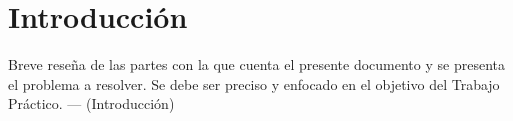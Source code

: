 \section{Introducción}

Breve  reseña  de  las  partes  con  la  que  cuenta  el  presente  documento  y  se  presenta  el problema a resolver. Se debe ser preciso y enfocado en el objetivo del Trabajo Práctico.
—
(Introducción)
